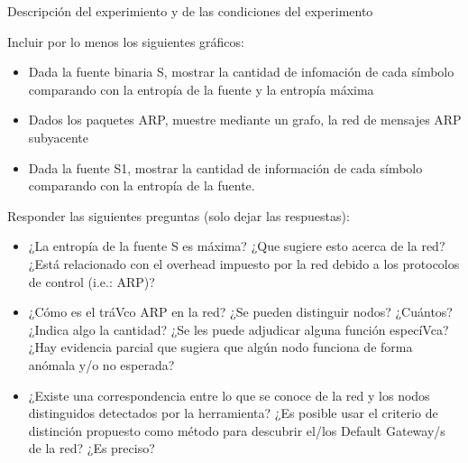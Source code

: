 Descripci\'on del experimiento y de las condiciones del experimento

Incluir por lo menos los siguientes gr\'aficos:

\begin{itemize}
	\item Dada la fuente binaria S, mostrar la cantidad de infomación de cada símbolo comparando con la entropía de la fuente y la entropía máxima
	\item Dados los paquetes ARP, muestre mediante un grafo, la red de mensajes ARP subyacente
	\item Dada la fuente S1, mostrar la cantidad de información de cada símbolo comparando con la entropía de la fuente.
\end{itemize}

Responder las siguientes preguntas (solo dejar las respuestas):

\begin{itemize}
	\item ¿La entropía de la fuente S es máxima? ¿Que sugiere esto acerca de la red? ¿Está relacionado con el overhead impuesto por la red debido a los protocolos de control (i.e.: ARP)?
	\item ¿Cómo es el tráVco ARP en la red? ¿Se pueden distinguir nodos? ¿Cuántos? ¿Indica algo la cantidad? ¿Se les puede adjudicar alguna función especíVca? ¿Hay evidencia parcial que sugiera que algún nodo funciona de forma anómala y/o no esperada?
	\item ¿Existe una correspondencia entre lo que se conoce de la red y los nodos distinguidos detectados por la herramienta? ¿Es posible usar el criterio de distinción propuesto como método para descubrir el/los Default Gateway/s de la red? ¿Es preciso?
\end{itemize}
